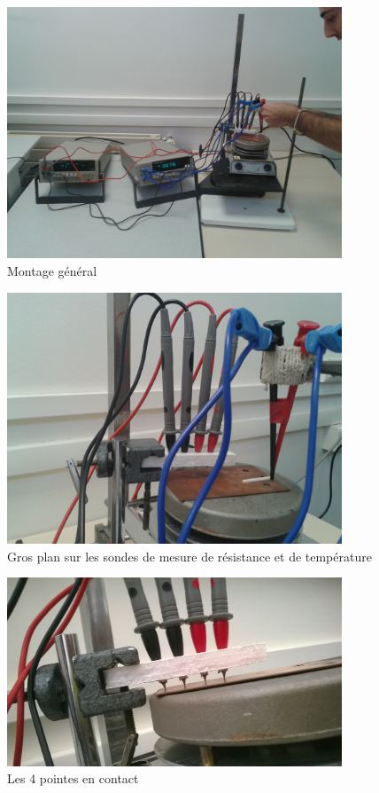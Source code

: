 \begin{figure}[!t]
  \begin{center}
		\includegraphics[width=10cm]{./images/photo1.jpg}
		\caption{Montage général}
		\label{photo1}
	\end{center}
\end{figure}
\begin{figure}[!b]
  \begin{center}
		\includegraphics[width=10cm]{./images/photo2.jpg}
		\caption{Gros plan sur les sondes de mesure de résistance et de température}
		\label{photo2}
	\end{center}
\end{figure}
\begin{figure}[!t]
  \begin{center}
		\includegraphics[width=10cm]{./images/photo3.jpg}
		\caption{Les 4 pointes en contact}
		\label{photo3}
	\end{center}
\end{figure}

